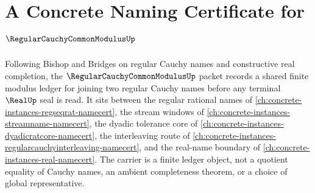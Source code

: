 \chapter{A Concrete Naming Certificate for $\RegularCauchyCommonModulusUp$}
\label{ch:concrete-instances-regular-cauchy-common-modulus-namecert}

Following Bishop and Bridges on regular Cauchy names and constructive real completion, the $\RegularCauchyCommonModulusUp$ packet records a shared finite modulus ledger for joining two regular Cauchy names before any terminal $\RealUp$ seal is read. It sits between the regular rational names of \autoref{ch:concrete-instances-regseqrat-namecert}, the stream windows of \autoref{ch:concrete-instances-streamname-namecert}, the dyadic tolerance core of \autoref{ch:concrete-instances-dyadicratcore-namecert}, the interleaving route of \autoref{ch:concrete-instances-regularcauchyinterleaving-namecert}, and the real-name boundary of \autoref{ch:concrete-instances-real-namecert}. The carrier is a finite ledger object, not a quotient equality of Cauchy names, an ambient completeness theorem, or a choice of global representative.

